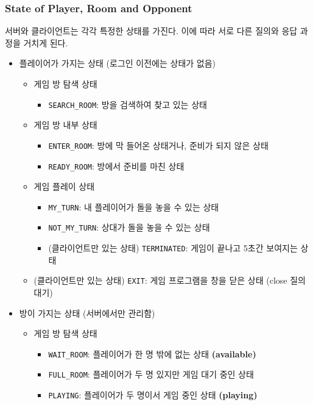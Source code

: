 \documentclass[a4paper, 10pt]{article}
\begin{document}
\subsubsection{State of Player, Room and Opponent}
서버와 클라이언트는 각각 특정한 상태를 가진다. 이에 따라 서로 다른 질의와 응답 과정을
거치게 된다.
\begin{itemize}
  \item 플레이어가 가지는 상태 (로그인 이전에는 상태가 없음)
  \begin{itemize}
    \item 게임 방 탐색 상태
    \begin{itemize}
      \item \texttt{SEARCH\_ROOM}: 방을 검색하여 찾고 있는 상태
    \end{itemize}
    \item 게임 방 내부 상태
    \begin{itemize}
      \item \texttt{ENTER\_ROOM}: 방에 막 들어온 상태거나, 준비가 되지 않은 상태
      \item \texttt{READY\_ROOM}: 방에서 준비를 마친 상태
    \end{itemize}
    \item 게임 플레이 상태
    \begin{itemize}
      \item \texttt{MY\_TURN}: 내 플레이어가 돌을 놓을 수 있는 상태
      \item \texttt{NOT\_MY\_TURN}: 상대가 돌을 놓을 수 있는 상태
      \item (클라이언트만 있는 상태) \texttt{TERMINATED}: 게임이 끝나고 5초간 보여지는 상태
    \end{itemize}
    \item (클라이언트만 있는 상태) \texttt{EXIT}: 게임 프로그램을 창을 닫은 상태 (close 질의 대기)
  \end{itemize}
  \item 방이 가지는 상태 (서버에서만 관리함)
  \begin{itemize}
    \item 게임 방 탐색 상태
    \begin{itemize}
      \item \texttt{WAIT\_ROOM}: 플레이어가 한 명 밖에 없는 상태 \textbf{(available)}
      \item \texttt{FULL\_ROOM}: 플레이어가 두 명 있지만 게임 대기 중인 상태
      \item \texttt{PLAYING}: 플레이어가 두 명이서 게임 중인 상태 \textbf{(playing)}
    \end{itemize}

\end{itemize}
\end{itemize}
\end{document}
